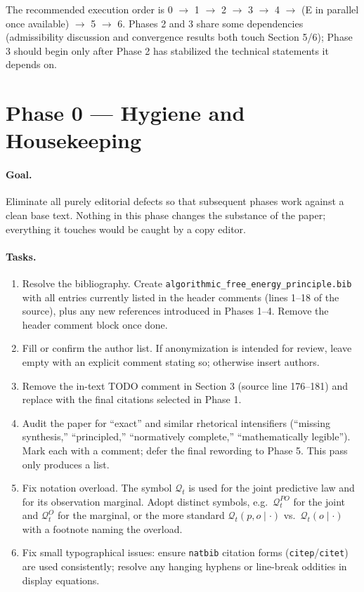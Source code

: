 \documentclass[11pt]{article}
\begin{document}
The recommended execution order is 0 $\to$ 1 $\to$ 2 $\to$ 3 $\to$ 4 $\to$ (E in parallel once available) $\to$ 5 $\to$ 6. Phases 2 and 3 share some dependencies (admissibility discussion and convergence results both touch Section 5/6); Phase 3 should begin only after Phase 2 has stabilized the technical statements it depends on.

\section{Phase 0 --- Hygiene and Housekeeping}
\label{sec:phase0}

\paragraph{Goal.} Eliminate all purely editorial defects so that subsequent phases work against a clean base text. Nothing in this phase changes the substance of the paper; everything it touches would be caught by a copy editor.

\paragraph{Tasks.}
\begin{enumerate}[leftmargin=*]
\item Resolve the bibliography. Create \texttt{algorithmic\_free\_energy\_principle.bib} with all entries currently listed in the header comments (lines 1--18 of the source), plus any new references introduced in Phases 1--4. Remove the header comment block once done.
\item Fill or confirm the author list. If anonymization is intended for review, leave empty with an explicit comment stating so; otherwise insert authors.
\item Remove the in-text TODO comment in Section 3 (source line 176--181) and replace with the final citations selected in Phase 1.
\item Audit the paper for ``exact'' and similar rhetorical intensifiers (``missing synthesis,'' ``principled,'' ``normatively complete,'' ``mathematically legible''). Mark each with a comment; defer the final rewording to Phase 5. This pass only produces a list.
\item Fix notation overload. The symbol $\mathcal{Q}_t$ is used for the joint predictive law and for its observation marginal. Adopt distinct symbols, e.g.\ $\mathcal{Q}_t^{PO}$ for the joint and $\mathcal{Q}_t^O$ for the marginal, or the more standard $\mathcal{Q}_t(p,o\mid\cdot)$ vs.\ $\mathcal{Q}_t(o\mid\cdot)$ with a footnote naming the overload.
\item Fix small typographical issues: ensure \texttt{natbib} citation forms (\texttt{citep}/\texttt{citet}) are used consistently; resolve any hanging hyphens or line-break oddities in display equations.
\end{enumerate}
\end{document}
